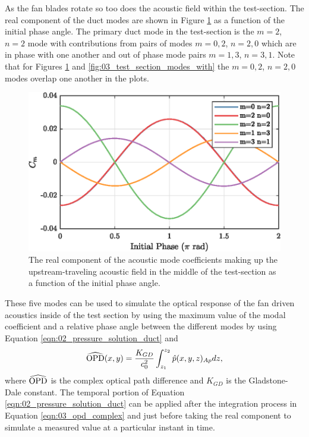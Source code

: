As the fan blades rotate so too does the acoustic field within the test-section.
The real component of the duct modes are shown in Figure \ref{fig:03_test_section_modes} as a function of the initial phase angle.
The primary duct mode in the test-section is the $m=2$, $n=2$ mode with contributions from pairs of modes $m=0,2$, $n=2,0$ which are in phase with one another and out of phase mode pairs $m=1,3$, $n=3,1$.
Note that for Figures \ref{fig:03_test_section_modes} and \ref{fig:03_test_section_modes_with} the $m=0,2$, $n=2,0$ modes overlap one another in the plots.
\begin{figure}
  \centering
  \includegraphics{../matlab/03_aero_optics_acoustics/tunnel_acoustic_against_0.6_8_0.eps}
  \caption{The real component of the acoustic mode coefficients making up the upstream-traveling acoustic field in the middle of the test-section as a function of the initial phase angle.}
  \label{fig:03_test_section_modes}
\end{figure}
These five modes can be used to simulate the optical response of the fan driven acoustics inside of the test section by using the maximum value of the modal coefficient and a relative phase angle between the different modes by using Equation \ref{eqn:02_pressure_solution_duct} and
\begin{equation}
  \widehat{\operatorname{OPD}}(x,y) = \frac{K_{GD}}{c_0^2}\int_{z_1}^{z_2} \hat{p}(x,y,z)_{Ap}dz \textrm{,}
  \label{eqn:03_opd_complex}
\end{equation}
where $\widehat{\operatorname{OPD}}$ is the complex optical path difference and $K_{GD}$ is the Gladstone-Dale constant.
The temporal portion of Equation \ref{eqn:02_pressure_solution_duct} can be applied after the integration process in Equation \ref{eqn:03_opd_complex} and just before taking the real component to simulate a measured value at a particular instant in time.


